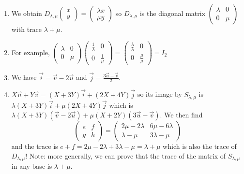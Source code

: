 \begin{enumerate}
\item We obtain
$D_{\lambda,\mu} \begin{pmatrix}
  x \\
  y
\end{pmatrix} = \begin{pmatrix}
  \lambda x \\
  \mu y
\end{pmatrix}$ so $D_{\lambda,\mu}$ is the diagonal matrix $\begin{pmatrix}
  \lambda & 0 \\
  0 & \mu
\end{pmatrix}
  $ with trace $\lambda+\mu$.

\item For example,
  $\begin{pmatrix}
  \lambda & 0 \\
  0 & \mu
\end{pmatrix} \begin{pmatrix}
  \frac{1}{\lambda} & 0 \\
  0 & \frac{1}{\mu}
\end{pmatrix} = \begin{pmatrix}
  \frac{\lambda}{\lambda} & 0 \\
  0 & \frac{\mu}{\mu}
\end{pmatrix} = I_2$
\item We have $\vec{i} =  \vec{v} - 2\vec{u}$ and
  $\vec{j} = \frac{3\vec{u}-\vec{v}}{2}$.

\item $X\vec{u} +Y\vec{v} = \left(X+3Y\right)\vec{i}
  + \left(2X+4Y\right)\vec{j}$ so its image by $S_{\lambda,\mu}$ is
  $\lambda \left(X+3Y\right)\vec{i} + \mu \left(2X+4Y\right)\vec{j}$ which is
  $\lambda \left(X+3Y\right)\left(\vec{v} - 2\vec{u}\right) +
  \mu \left(X+2Y\right)\left(3\vec{u} - \vec{v}\right)$. We then find
  $$\begin{pmatrix} e & f \\ g & h \end{pmatrix} = \begin{pmatrix}
  2\mu-2\lambda & 6\mu-6\lambda \\
  \lambda-\mu & 3\lambda-\mu
  \end{pmatrix}$$
  and the trace is $e+f=2\mu-2\lambda+3\lambda-\mu=\lambda+\mu$ which is also
  the trace of $D_{\lambda,\mu}$! Note: more generally, we can prove that the
  trace of the matrix of $S_{\lambda,\mu}$ in any base is $\lambda+\mu$.


\end{enumerate}
